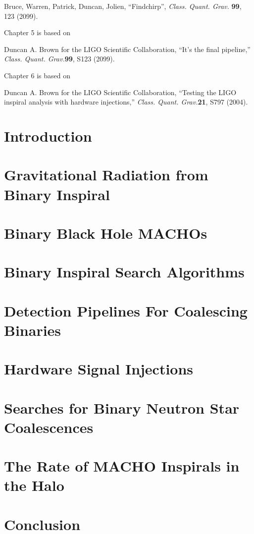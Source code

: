 \documentclass[12pt]{report}
\newcommand{\cqg}{{\it Class. Quant. Grav.}}
\begin{document}
\noindent Bruce, Warren, Patrick, Duncan, Jolien, ``Findchirp'', \cqg {\bf
99}, 123 (2099).

\noindent Chapter 5 is based on

\noindent Duncan A. Brown for the LIGO Scientific Collaboration, ``It's the
final pipeline,'' \cqg {\bf 99}, S123 (2099).

\noindent Chapter 6 is based on 

\noindent Duncan A. Brown for the LIGO Scientific Collaboration, ``Testing the
LIGO inspiral analysis with hardware injections,'' \cqg {\bf 21}, S797 (2004).


\afterpreface

\chapter{Introduction}

\chapter{Gravitational Radiation from Binary Inspiral}

\chapter{Binary Black Hole MACHOs}

\chapter{Binary Inspiral Search Algorithms}

\chapter{Detection Pipelines For Coalescing Binaries}

\chapter{Hardware Signal Injections}

\chapter{Searches for Binary Neutron Star Coalescences}

\chapter{The Rate of MACHO Inspirals in the Halo}


\chapter{Conclusion}

\end{document}
